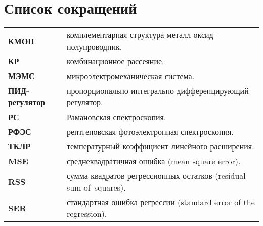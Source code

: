 \chapter*{Список сокращений}             %
\noindent%
\addtocounter{table}{-1}%
\begin{longtabu} to \textwidth {l X}

\textbf{КМОП} & комплементарная структура металл-оксид-полупроводник.\\

\textbf{КР} & комбинационное рассеяние.\\

\textbf{МЭМС} & микроэлектромеханическая система.\\

\textbf{ПИД-регулятор} & пропорционально-интегрально-дифференцирующий регулятор.\\
\textbf{РС} & Рамановская спектроскопия.\\
\textbf{РФЭС} & рентгеновская фотоэлектронная спектроскопия.\\

\textbf{ТКЛР} & температурный коэффициент линейного расширения.\\
\textbf{MSE} & среднеквадратичная ошибка (mean square error).\\

\textbf{RSS} & сумма квадратов регрессионных остатков (residual sum of~squares).\\

\textbf{SER} & стандартная ошибка регрессии (standard error of the regression).\\

\end{longtabu}
